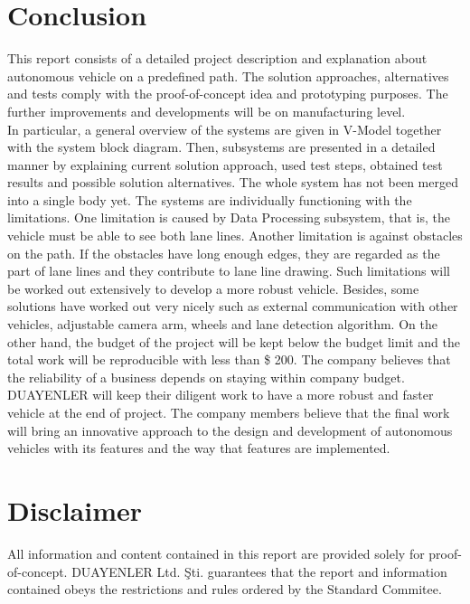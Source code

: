 \documentclass[a4paper,12pt]{article}
\begin{document}
	\section{Conclusion}
	This report consists of a detailed project description and explanation about autonomous vehicle on a predefined path. The solution approaches, alternatives and tests comply with the proof-of-concept idea and prototyping purposes. The further improvements and developments will be on manufacturing level.\\
	
	In particular, a general overview of the systems are given in V-Model together with the system block diagram. Then, subsystems are presented in a detailed manner by explaining current solution approach, used test steps, obtained test results and possible solution alternatives. The whole system has not been merged into a single body yet. The systems are individually functioning with the limitations. One limitation is caused by Data Processing subsystem, that is, the vehicle must be able to see both lane lines. Another limitation is against obstacles on the path. If the obstacles have long enough edges, they are regarded as the part of lane lines and they contribute to lane line drawing. Such limitations will be worked out extensively to develop a more robust vehicle. Besides, some solutions have worked out very nicely such as external communication with other vehicles, adjustable camera arm, wheels and lane detection algorithm. On the other hand, the budget of the project will be kept below the budget limit and the total work will be reproducible with less than \$ 200. The company believes that the reliability of a business depends on staying within company budget. \\
	
	DUAYENLER will keep their diligent work to have a more robust and faster vehicle at the end of project. The company members believe that the final work will bring an innovative approach to the design and development of autonomous vehicles with its features and the way that features are implemented.
	\newpage
		\section{Disclaimer}
		\vspace{1cm}
		
		\textsf{ All information and content contained in this report are provided solely for proof-of-concept. DUAYENLER Ltd. Şti. guarantees that the report and information contained obeys the restrictions and rules ordered by the Standard Commitee.}
		
\end{document}
